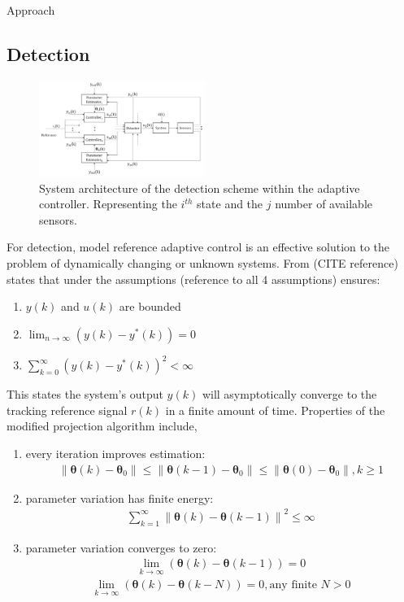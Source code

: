 \begin{section}{Approach}
\subsection{Detection}

\begin{figure}
\vspace{1pt}
\centering
\includegraphics[width=0.48\textwidth]{con_and_det.png}
\caption{System architecture of the detection scheme within the adaptive controller. Representing the $i^{th}$ state and the $j$ number of available sensors.}
\label{fig:det_arch}
\end{figure}

For detection, model reference adaptive control is an effective solution to the problem of dynamically changing or unknown systems. From (CITE reference) states that under the assumptions (reference to all 4 assumptions) ensures:
	\begin{enumerate}[label=(\roman*),leftmargin=4\parindent]
	\item $y(k)$ and $u(k)$ are bounded 
	\item $\lim_{n\to\infty}(y(k)-y^*(k))=0$
	\item $\sum_{k=0}^\infty(y(k)-y^*(k))^2<\infty$
	\end{enumerate}
This states the system's output $y(k)$ will asymptotically converge to the tracking reference signal $r(k)$ in a finite amount of time. Properties of the modified projection algorithm include,
    \begin{enumerate}[label=(\roman*),leftmargin=3\parindent]
	\item every iteration improves estimation:
	    \begin{align}
	        \|\bm{\theta}(k)-\bm{\theta}_0\|\leq\|\bm{\theta}(k-1)-\bm{\theta}_0\|\leq\|\bm{\theta}(0)-\bm{\theta}_0\|, k\geq1 \nonumber
	    \end{align}
	\item parameter variation has finite energy:
	    \begin{align}
	        \sum_{k=1}^\infty{\|\bm{\theta}(k)-\bm{\theta}(k-1)\|}^2\leq \infty \nonumber
	    \end{align}
	\item parameter variation converges to zero:
	    \begin{align}
	        \lim_{k\to\infty}(\bm{\theta}(k)-\bm{\theta}(k-1))=0 \nonumber
	    \end{align}
	    \begin{align}
	        \lim_{k\to\infty}(\bm{\theta}(k)-\bm{\theta}(k-N))=0, \text{any finite } N>0 \nonumber
	    \end{align}
	\end{enumerate}


\end{section}
